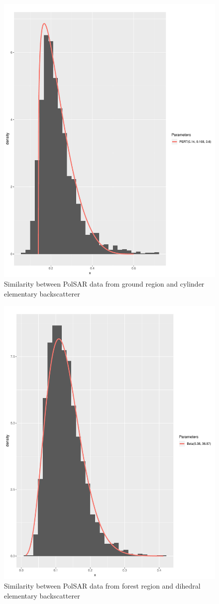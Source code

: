 \documentclass[conference]{IEEEtran}
\begin{document}
\begin{figure}[!ht]
    \centering
    \includegraphics[width = .9\linewidth, height = .7\linewidth]{../../../Figures/paper_19_05/cy_ground.pdf}
    \caption{Similarity between PolSAR data from ground region and cylinder elementary backscatterer}
    \label{fig:gr_cy}
\end{figure}

\begin{figure}[!ht]
    \centering
    \includegraphics[width = .9\linewidth, height = .7\linewidth]{../../../Figures/paper_19_05/di_vegetation.pdf}
    \caption{Similarity between PolSAR data from forest region and dihedral elementary backscatterer}
    \label{fig:fr_di}
\end{figure}
\end{document}
